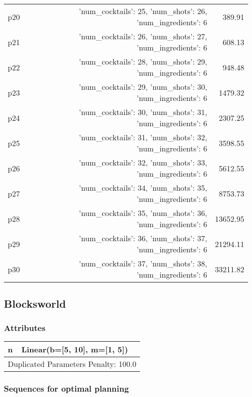 \documentclass{article}
\begin{document}
\begin{center}
\begin{tabular}{@{}l|r|r@{}}
  p20&{'num\_cocktails': 25, 'num\_shots': 26, 'num\_ingredients': 6}&389.91\\
  p21&{'num\_cocktails': 26, 'num\_shots': 27, 'num\_ingredients': 6}&608.13\\
  p22&{'num\_cocktails': 28, 'num\_shots': 29, 'num\_ingredients': 6}&948.48\\
  p23&{'num\_cocktails': 29, 'num\_shots': 30, 'num\_ingredients': 6}&1479.32\\
  p24&{'num\_cocktails': 30, 'num\_shots': 31, 'num\_ingredients': 6}&2307.25\\
  p25&{'num\_cocktails': 31, 'num\_shots': 32, 'num\_ingredients': 6}&3598.55\\
  p26&{'num\_cocktails': 32, 'num\_shots': 33, 'num\_ingredients': 6}&5612.55\\
  p27&{'num\_cocktails': 34, 'num\_shots': 35, 'num\_ingredients': 6}&8753.73\\
  p28&{'num\_cocktails': 35, 'num\_shots': 36, 'num\_ingredients': 6}&13652.95\\
  p29&{'num\_cocktails': 36, 'num\_shots': 37, 'num\_ingredients': 6}&21294.11\\
  p30&{'num\_cocktails': 37, 'num\_shots': 38, 'num\_ingredients': 6}&33211.82
                            \end{tabular}
                            \end{center}
                    
                            \newpage \subsection{Blocksworld}
                    \subsubsection*{Attributes}
                    \begin{tabular}{@{}p{}p{}@{}}
                    \toprule
                    n & Linear(b=[5, 10], m=[1, 5]) \\
                    \bottomrule
                    \multicolumn{2}{l}{Duplicated Parameters Penalty: 100.0}
                    \end{tabular}
                
                            \subsubsection*{Sequences for optimal planning}
\end{document}
